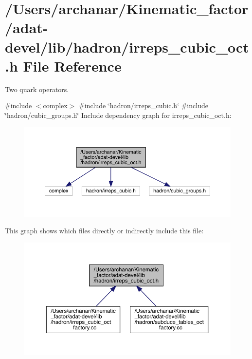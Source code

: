 \hypertarget{adat-devel_2lib_2hadron_2irreps__cubic__oct_8h}{}\section{/\+Users/archanar/\+Kinematic\+\_\+factor/adat-\/devel/lib/hadron/irreps\+\_\+cubic\+\_\+oct.h File Reference}
\label{adat-devel_2lib_2hadron_2irreps__cubic__oct_8h}


Two quark operators.  


{\ttfamily \#include $<$complex$>$}\newline
{\ttfamily \#include \char`\"{}hadron/irreps\+\_\+cubic.\+h\char`\"{}}\newline
{\ttfamily \#include \char`\"{}hadron/cubic\+\_\+groups.\+h\char`\"{}}\newline
Include dependency graph for irreps\+\_\+cubic\+\_\+oct.\+h\+:
\nopagebreak
\begin{figure}[H]
\begin{center}
\leavevmode
\includegraphics[width=350pt]{d6/d07/adat-devel_2lib_2hadron_2irreps__cubic__oct_8h__incl}
\end{center}
\end{figure}
This graph shows which files directly or indirectly include this file\+:
\nopagebreak
\begin{figure}[H]
\begin{center}
\leavevmode
\includegraphics[width=350pt]{d3/d24/adat-devel_2lib_2hadron_2irreps__cubic__oct_8h__dep__incl}
\end{center}
\end{figure}
